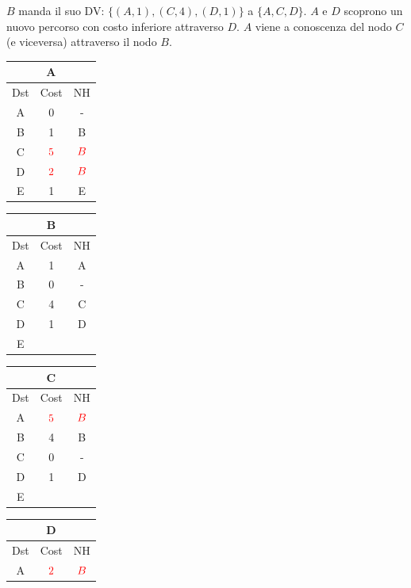 \documentclass[10pt]{article}
\begin{document}
	\newline \newline \newline
	$B$ manda il suo DV: $\{(A,1),(C,4),(D,1)\}$ a $\{A,C,D\}$.
	\newline
	$A$ e $D$ scoprono un nuovo percorso con costo inferiore attraverso $D$.
	\newline
	$A$ viene a conoscenza del nodo $C$ (e viceversa) attraverso il nodo $B$.
	\begin{table}[h!]
		\begin{tabular}{|c||c||c|}
 			\hline
	 		\multicolumn{3}{|c|}{A} \\
 			\hline
 			Dst & Cost & NH\\
 			\hline
 			A & 0 & - \\
 			B & 1 & B \\
 			C & $\color{red} 5$ & $\color{red} B$ \\
 			D & $\color{red} 2$ & $\color{red} B$ \\
 			E & 1 & E \\
 			\hline
		\end{tabular}
		\begin{tabular}{|c||c||c|}
 			\hline
	 		\multicolumn{3}{|c|}{B} \\
 			\hline
 			Dst & Cost & NH\\
 			\hline
 			A & 1 & A \\
 			B & 0 & - \\
 			C & 4 & C  \\
 			D & 1 & D \\
 			E &   &   \\
 			\hline
		\end{tabular}
		\begin{tabular}{|c||c||c|}
 			\hline
	 		\multicolumn{3}{|c|}{C} \\
 			\hline
 			Dst & Cost & NH\\
 			\hline
 			A & $\color{red} 5$ & $\color{red} B$ \\
 			B & 4 & B \\
 			C & 0 & - \\
 			D & 1 & D \\
 			E &   &   \\
 			\hline
		\end{tabular}
		\begin{tabular}{|c||c||c|}
 			\hline
	 		\multicolumn{3}{|c|}{D} \\
 			\hline
 			Dst & Cost & NH\\
 			\hline
 			A & $\color{red} 2$ & $\color{red} B$ \\

\end{tabular}
\end{table}
\end{document}
